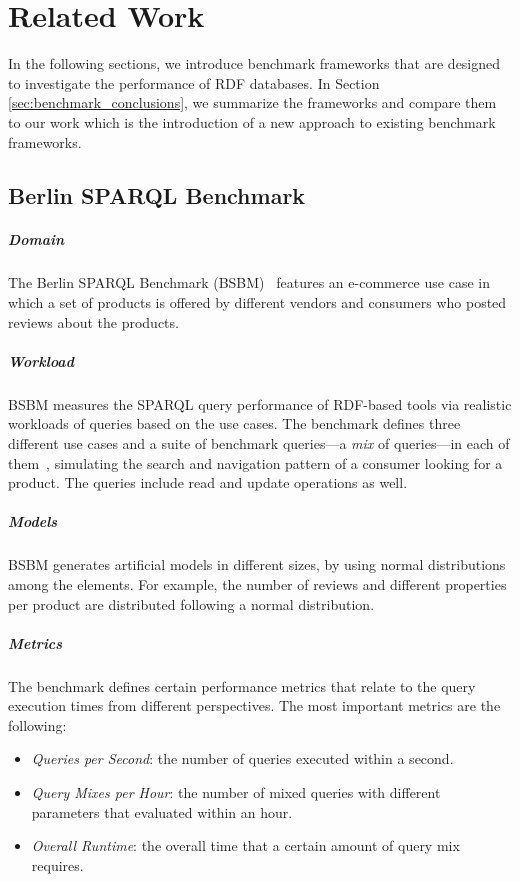 \chapter{Related Work}\label{chapter:related_work}

In the following sections, we introduce benchmark frameworks that are designed to investigate the performance of RDF databases. In Section \ref{sec:benchmark_conclusions}, we summarize the frameworks and compare them to our work which is the introduction of a new approach to existing benchmark frameworks.

\section{Berlin SPARQL Benchmark}

\paragraph{Domain}
The Berlin SPARQL Benchmark (BSBM)~\cite{berlin} features an e-commerce use case in which a set of products is offered by different vendors and consumers who posted reviews about the products. 

\paragraph{Workload}
BSBM measures the SPARQL query performance of RDF-based tools via realistic workloads of queries based on the use cases. The benchmark defines three different use cases and a suite of benchmark queries---a \textit{mix} of queries---in each of them~\cite{berlin_specification}, simulating the search and navigation pattern of a consumer looking for a product. The queries include read and update operations as well.

\paragraph{Models}
BSBM generates artificial models in different sizes, by using normal distributions among the elements. For example, the number of reviews and different properties per product are distributed following a normal distribution.

\paragraph{Metrics}
The benchmark defines certain performance metrics that relate to the query execution times from different perspectives. The most important metrics are the following:
\begin{itemize}
	\item{\textit{Queries per Second}}: the number of queries executed within a second.
	\item{\textit{Query Mixes per Hour}}: the number of mixed queries with different parameters that evaluated within an hour.
	\item{\textit{Overall Runtime}}: the overall time that a certain amount of query mix requires.
\end{itemize}


